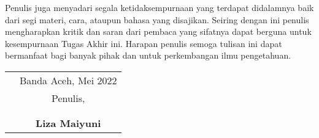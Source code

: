 
Penulis juga menyadari segala ketidaksempurnaan yang terdapat didalamnya baik dari segi materi, cara, ataupun bahasa yang disajikan. Seiring dengan ini penulis mengharapkan kritik dan saran dari pembaca yang sifatnya dapat berguna untuk kesempurnaan Tugas Akhir ini. Harapan penulis semoga tulisan ini dapat bermanfaat bagi banyak pihak dan untuk perkembangan ilmu pengetahuan.

\vspace{0.5cm}


\begin{tabular}{p{7.5cm}c}
	 & Banda Aceh, Mei 2022  \\
	 & Penulis,              \\
	 &                       \\
	 &                       \\
	 & \textbf{Liza Maiyuni}
\end{tabular}